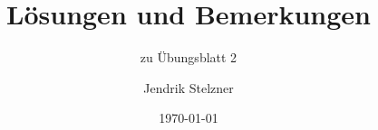 \documentclass[a4paper, 10pt, numbers = noenddot]{scrartcl}
\title{Lösungen und Bemerkungen}
\subtitle{zu Übungsblatt 2}
\author{Jendrik Stelzner}
\date{\today}
\begin{document}
\maketitle





\begin{appendices}

\end{appendices}
\end{document}
